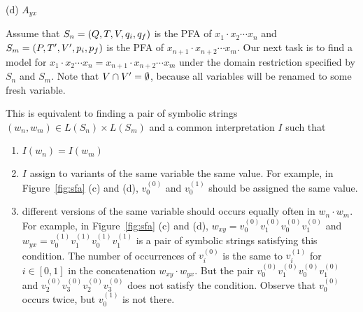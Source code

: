 \documentclass[sigplan,review,anonymous]{acmart}\settopmatter{printfolios=true,printccs=false,printacmref=false}
\begin{document}
\begin{figure*}
\begin{minipage}[t]{0.28\textwidth}
	
	\centering
	(d) $A_{yx}$
	\end{minipage}

	\caption{Symbolic flat automata of $x$, $y$, $xy$ and $yx$}
	\label{fig:sfa}
\end{figure*}

Assume that $S_n=(Q,T,V,q_i,q_f)$ is the PFA of $x_1\cdot x_2 \cdots x_n$ and $S_m=(P,T',V',p_i,p_f)$ is the PFA of $x_{n+1}\cdot x_{n+2} \cdots x_m$. Our next task is to find a model for $x_1\cdot x_2 \cdots x_n = x_{n+1}\cdot x_{n+2} \cdots x_m$ under the domain restriction specified by $S_n$ and $S_m$. 
Note that $V \cap V' =\emptyset$, because all variables will be renamed to some fresh variable. 


This is equivalent to finding a pair of symbolic strings $(w_n,w_m) \in L(S_n)\times L(S_m)$ and a common interpretation $I$ such that 
\begin{enumerate}
	\item $I(w_n)=I(w_m)$
	\item $I$ assign to variants of the same variable the same value. For example, in Figure~\ref{fig:sfa} (c) and (d), $v_0^{(0)}$ and $v_0^{(1)}$ should be assigned the same value.
	\item different versions of the same variable should occurs equally often in $w_n\cdot w_m$. For example, in Figure~\ref{fig:sfa} (c) and (d), $w_{xy}=v_0^{(0)}v_1^{(0)}v_0^{(0)}v_1^{(0)}$ and $w_{yx}=v_0^{(1)}v_1^{(1)}v_0^{(1)}v_1^{(1)}$ is a pair of symbolic strings satisfying this condition. The number of occurrences of $v_i^{(0)}$ is the same to $v_i^{(1)}$ for $i\in[0,1]$ in the concatenation $w_{xy}\cdot w_{yx}$.
	But the pair $v_0^{(0)}v_1^{(0)}v_0^{(0)}v_1^{(0)}$ and $v_2^{(0)}v_3^{(0)}v_2^{(0)}v_3^{(0)}$ does not satisfy the condition. Observe that $v_0^{(0)}$ occurs twice, but $v_0^{(1)}$ is not there.
\end{enumerate}
\end{document}
